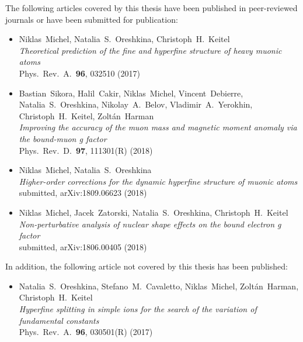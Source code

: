 \ifthispageodd{}{\cleardoublepage}


\noindent \normalfont
The following articles covered by this thesis have been published in peer-reviewed \\journals or have been submitted for publication:

\begin{itemize}
\item Niklas~Michel, Natalia~S.~Oreshkina, Christoph~H.~Keitel \\ 
\textit{Theoretical prediction of the fine and hyperfine structure of heavy muonic atoms} \\ 
Phys.~Rev.~A.~\textbf{96}, 032510 (2017) \vspace*{5pt} \\
%
\item Bastian~Sikora, Halil~Cakir, Niklas~Michel, Vincent~Debierre, Natalia~S.~Oreshkina, Nikolay~A.~Belov, Vladimir~A.~Yerokhin, Christoph~H.~Keitel, Zoltán~Harman \\ 
\textit{Improving the accuracy of the muon mass and magnetic moment anomaly via the bound-muon g factor} \\ 
Phys.~Rev.~D.~\textbf{97}, 111301(R) (2018) \vspace*{5pt} \\
\item Niklas~Michel, Natalia~S.~Oreshkina \\ 
\textit{Higher-order corrections for the dynamic hyperfine structure of muonic atoms}\\
submitted, arXiv:1809.06623 (2018) \vspace*{5pt} \\
\item Niklas~Michel, Jacek~Zatorski, Natalia~S.~Oreshkina, Christoph~H.~Keitel \\ 
\textit{Non-perturbative analysis of nuclear shape effects on the bound electron g factor}\\
submitted, arXiv:1806.00405 (2018) \vspace*{5pt} \\
\end{itemize} 


\vspace{1.5cm}

\noindent
In addition, the following article not covered by this thesis has been published:

\begin{itemize}
\item Natalia~S.~Oreshkina, Stefano~M.~Cavaletto, Niklas~Michel, Zoltán~Harman,\\Christoph~H.~Keitel \\ 
\textit{Hyperfine splitting in simple ions for the search of the variation of fundamental constants} \\ 
Phys.~Rev.~A.~\textbf{96}, 030501(R) (2017) \vspace*{5pt} \\
\end{itemize} 

\thispagestyle{empty}
